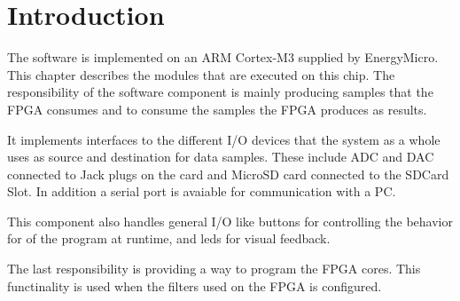 \section{Introduction}

The software is implemented on an ARM Cortex-M3 supplied by EnergyMicro. This
chapter describes the modules that are executed on this chip.
The responsibility of the software component is mainly producing samples that
the FPGA consumes and to consume the samples the FPGA produces as results.



It implements interfaces to the different I/O devices that the system as a whole
uses as source and destination for data samples. These include ADC and DAC
connected to Jack plugs on the card and MicroSD card connected to the SDCard
Slot. In addition a serial port is avaiable for communication with a PC. 

This component also handles general I/O like buttons for controlling the
behavior for of the program at runtime, and leds for visual feedback.

The last responsibility is providing a way to program the FPGA cores. This
functinality is used when the filters used on the FPGA is configured. 
